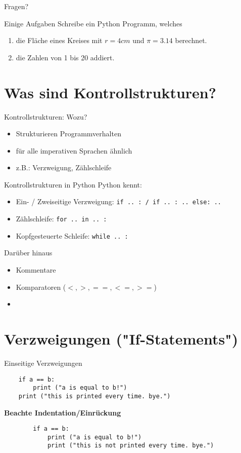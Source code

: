 \begin{frame}
	\huge Fragen?
\end{frame}

\begin{frame}{Einige Aufgaben}
	Schreibe ein Python Programm, welches
	\begin{enumerate}
		\item die Fläche eines Kreises mit $r=4cm$ und $\pi = 3.14$ berechnet.
		\item die Zahlen von 1 bis 20 addiert.
	\end{enumerate}
\end{frame}

\section{Was sind Kontrollstrukturen?}
\begin{frame}{Kontrollstrukturen: Wozu?}
    \begin{itemize}
        \item Strukturieren Programmverhalten
        \item für alle imperativen Sprachen ähnlich
        \item z.B.: Verzweigung, Zählschleife
    \end{itemize}
\end{frame}



\begin{frame}{Kontrollstrukturen in Python}
    Python kennt:
    \begin{itemize}
        \item Ein- / Zweiseitige Verzweigung: \texttt{if .. : / if .. : .. else: ..}
        \item Zählschleife: \texttt{for .. in .. :}
        \item Kopfgesteuerte Schleife: \texttt{while .. :}
    \end{itemize}
	\pause
	Darüber hinaus 
	\begin{itemize}
		\item Kommentare
		\item Komparatoren ($<,>,==, <=, >=$)
		\item 
	\end{itemize}
\end{frame}
\section{Verzweigungen ("{}If-Statements"{})}
\begin{frame}[fragile]{Einseitige Verzweigungen}
    \begin{lstlisting}
    if a == b:
        print ("a is equal to b!")
    print ("this is printed every time. bye.")
    \end{lstlisting}
	\pause
	\textbf{Beachte Indentation/Einrückung}
	\begin{lstlisting}
		if a == b:
			print ("a is equal to b!")
			print ("this is not printed every time. bye.")
	\end{lstlisting}
\end{frame}

